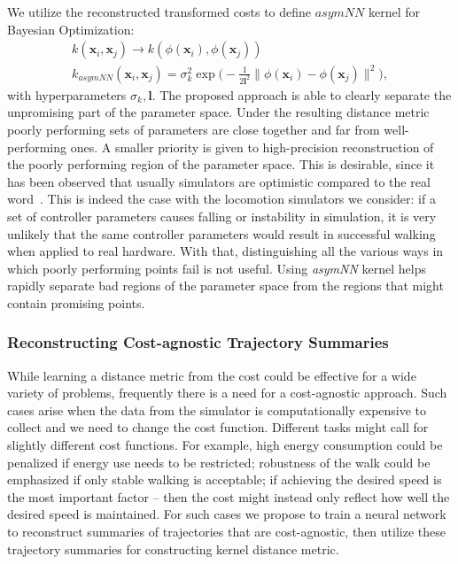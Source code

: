 We utilize the reconstructed transformed costs to define $\textit{asymNN}$ kernel for Bayesian Optimization:
\begin{align}
    k(\pmb{x}_i, \pmb{x}_j) \rightarrow k(\phi(\pmb{x}_i), \phi(\pmb{x}_j)) \\
    k_{asymNN}(\pmb{x}_i, \pmb{x}_j) = \sigma_k^2 \exp\Big(- \frac{1}{2 \pmb{l}^2} \|\phi(\pmb{x}_i) - \phi(\pmb{x}_j)\|^2 \Big),
\end{align}
with hyperparameters $\sigma_k, \pmb{l}$.
The proposed approach is able to clearly separate the unpromising part of the parameter space. Under the resulting distance metric poorly performing sets of parameters are close together and far from well-performing ones. 
A smaller priority is given to high-precision reconstruction of the poorly performing region of the parameter space. This is desirable, since it has been observed that usually simulators are optimistic compared to the real word~\citep{cutler2015real}. This is indeed the case with the locomotion simulators we consider: if a set of controller parameters causes falling or instability in simulation, it is very unlikely that the same controller parameters would result in successful walking when applied to real hardware. With that, distinguishing all the various ways in which poorly performing points fail is not useful. Using \textit{asymNN} kernel helps rapidly separate bad regions of the parameter space from the regions that might contain promising points. 

\subsubsection{Reconstructing Cost-agnostic Trajectory Summaries}
\label{sec:approach_traj}

While learning a distance metric from the cost could be effective for a wide variety of problems, frequently there is a need for a cost-agnostic approach. Such cases arise when the data from the simulator is computationally expensive to collect and we need to change the cost function. Different tasks might call for slightly different cost functions. For example, high energy consumption could be penalized if energy use needs to be restricted; robustness of the walk could be emphasized if only stable walking is acceptable; if achieving the desired speed is the most important factor -- then the cost might instead only reflect how well the desired speed is maintained. For such cases we propose to train a neural network to reconstruct summaries of trajectories that are cost-agnostic, then utilize these trajectory summaries for constructing kernel distance metric.

